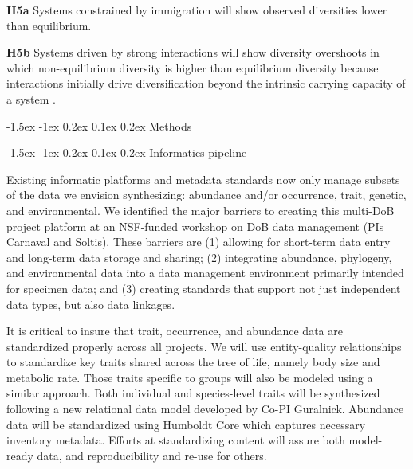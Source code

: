 \documentclass[11pt]{article}
\makeatletter
\renewcommand\subsection{\@startsection{subsection}{1}{\z@}%
                                  {-1.5ex \@plus -1ex \@minus 0.2ex}%
                                  {0.1ex \@plus 0.2ex}%
                                  {\normalfont\large\bfseries}}
\renewcommand\subsubsection{\@startsection{subsection}{1}{\z@}%
                                  {-1.5ex \@plus -1ex \@minus 0.2ex}%
                                  {0.1ex \@plus 0.2ex}%
                                  {\normalfont\bfseries}}
\makeatother
\begin{document}
\begin{adjustwidth}{2.5em}{0pt}
\hspace{1.5em}\textbf{H5a} Systems constrained by immigration \citep[e.g.~arthropod
communities on young substrates in Hawaii;][]{Rominger2015-kb} will
show observed diversities lower than equilibrium.

\textbf{H5b} Systems driven by strong interactions will show diversity
overshoots in which non-equilibrium diversity is higher than equilibrium
diversity because interactions initially drive diversification beyond
the intrinsic carrying capacity of a system \cite{Gillespie2010-bv}.
\end{adjustwidth}

\subsection{Methods}\label{methods}

\subsubsection{Informatics pipeline}\label{informatics-pipeline}

Existing informatic platforms and metadata standards now only manage
subsets of the data we envision synthesizing: abundance and/or
occurrence, trait, genetic, and environmental. We identified the major
barriers to creating this multi-DoB project platform at an NSF-funded
workshop on DoB data management (PIs Carnaval and Soltis). These
barriers are (1) allowing for short-term data entry and long-term data
storage and sharing; (2) integrating abundance, phylogeny, and
environmental data into a data management environment primarily intended
for specimen data; and (3) creating standards that support not just
independent data types, but also data linkages.

It is critical to insure that trait, occurrence, and abundance data
are standardized properly across all projects. We will use
entity-quality relationships to standardize key traits shared across
the tree of life, namely body size and metabolic rate. Those traits
specific to groups will also be modeled using a similar approach. Both
individual and species-level traits will be synthesized following a
new relational data model developed by Co-PI Guralnick.  Abundance
data will be standardized using Humboldt Core \cite{Guralnick2017-xb}
which captures necessary inventory metadata. Efforts at standardizing
content will assure both model-ready data, and reproducibility and
re-use for others.
\end{document}
